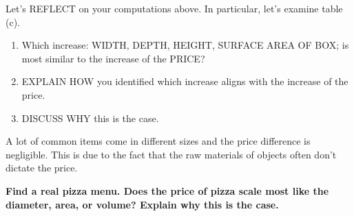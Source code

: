 \documentclass[nooutcomes,noauthor,12pt,]{ximera}
\begin{document}




\begin{question}
  Let's REFLECT on your computations above. In particular, let's
  examine table (c).%
  \begin{enumerate}
    \item Which increase: WIDTH, DEPTH, HEIGHT, SURFACE AREA OF BOX;
      is most similar to the increase of the PRICE?
    \item EXPLAIN HOW you identified which increase aligns with the
      increase of the price.
    \item DISCUSS WHY this is the case.
  \end{enumerate}
\end{question}
\mynewpage


\begin{question}
  A lot of common items come in different sizes and the price
  difference is negligible. This is due to the fact that the raw
  materials of objects often don't dictate the price.

  \textbf{Find a real pizza menu. Does the price of pizza scale most like the
  diameter, area, or volume?  Explain why this is the case.}
 
\end{question}
\end{document}

